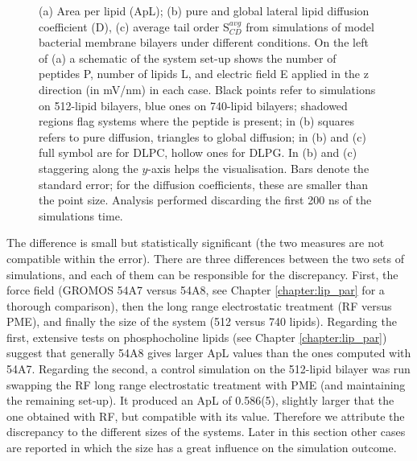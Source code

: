 \begin{figure}
\caption[ApL, D and S$_{CD}$ for atomistic membrane simulations]{(a) Area per lipid (ApL); (b) pure and global lateral lipid diffusion coefficient (D), (c) average tail order S$^{avg}_{CD}$ from simulations of model bacterial membrane bilayers under different conditions. On the left of (a) a schematic of the system set-up shows the number of peptides P, number of lipids L, and electric field E applied in the z direction (in mV/nm) in each case. 
%
Black points refer to simulations on 512-lipid bilayers, blue ones on 740-lipid bilayers; shadowed regions flag systems where the peptide is present; in (b) squares refers to pure diffusion, triangles to global diffusion; in (b) and (c) full symbol are for DLPC, hollow ones for DLPG.
In (b) and (c) staggering along the $y$-axis helps the visualisation.
%
Bars denote the standard error; for the diffusion coefficients, these are smaller than the point size. Analysis performed discarding the first 200 ns of the simulations time.}
\label{fig:lipids_ApL_D}
\end{figure}

The difference is small but statistically significant (the two measures are not compatible within the error).
%
There are three differences between the two sets of simulations, and each of them can be responsible for the discrepancy.
First, the force field (GROMOS 54A7 versus 54A8, see Chapter \ref{chapter:lip_par} for a thorough comparison), then the long range electrostatic treatment (RF versus PME), and finally the size of the system (512 versus 740 lipids).
%
Regarding the first, extensive tests on phosphocholine lipids (see Chapter \ref{chapter:lip_par}) suggest that generally 54A8 gives larger ApL values than the ones computed with 54A7.
%
Regarding the second, a control simulation on the 512-lipid bilayer was run swapping the RF long range electrostatic treatment with PME (and maintaining the remaining set-up). It produced an ApL of 0.586(5), slightly larger that the one obtained with RF, but compatible with its value.
%
Therefore we attribute the discrepancy to the different sizes of the systems. Later in this section other cases are reported in which the size has a great influence on the simulation outcome.

